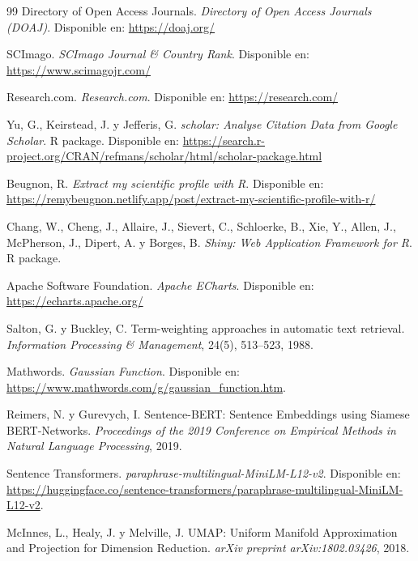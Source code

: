 \documentclass[11pt,spanish,listoffigures,listoftables]{tfgetsinf}
\begin{document}
\begin{thebibliography}{99}
Directory of Open Access Journals.
\newblock \textit{Directory of Open Access Journals (DOAJ)}.
\newblock Disponible en: \url{https://doaj.org/}

SCImago.
\newblock \textit{SCImago Journal \& Country Rank}.
\newblock Disponible en: \url{https://www.scimagojr.com/}

Research.com.
\newblock \textit{Research.com}.
\newblock Disponible en: \url{https://research.com/}

Yu, G., Keirstead, J. y Jefferis, G.
\newblock \textit{scholar: Analyse Citation Data from Google Scholar}.
\newblock R package.
\newblock Disponible en: \url{https://search.r-project.org/CRAN/refmans/scholar/html/scholar-package.html}

Beugnon, R.
\newblock \textit{Extract my scientific profile with R}.
\newblock Disponible en: \url{https://remybeugnon.netlify.app/post/extract-my-scientific-profile-with-r/}

Chang, W., Cheng, J., Allaire, J., Sievert, C., Schloerke, B., Xie, Y., Allen, J.,
McPherson, J., Dipert, A. y Borges, B.
\newblock \textit{Shiny: Web Application Framework for R}.
\newblock R package.

Apache Software Foundation.
\newblock \textit{Apache ECharts}.
\newblock Disponible en: \url{https://echarts.apache.org/}

Salton, G. y Buckley, C.
\newblock Term-weighting approaches in automatic text retrieval.
\newblock \textit{Information Processing \& Management}, 24(5), 513--523, 1988.

Mathwords.
\newblock \textit{Gaussian Function}.
\newblock Disponible en: \url{https://www.mathwords.com/g/gaussian_function.htm}.

Reimers, N. y Gurevych, I.
\newblock Sentence-BERT: Sentence Embeddings using Siamese BERT-Networks.
\newblock \textit{Proceedings of the 2019 Conference on Empirical Methods in Natural Language Processing}, 2019.

Sentence Transformers.
\newblock \textit{paraphrase-multilingual-MiniLM-L12-v2}.
\newblock Disponible en: \url{https://huggingface.co/sentence-transformers/paraphrase-multilingual-MiniLM-L12-v2}.

McInnes, L., Healy, J. y Melville, J.
\newblock UMAP: Uniform Manifold Approximation and Projection for Dimension Reduction.
\newblock \textit{arXiv preprint arXiv:1802.03426}, 2018.


\end{thebibliography}
\end{document}
